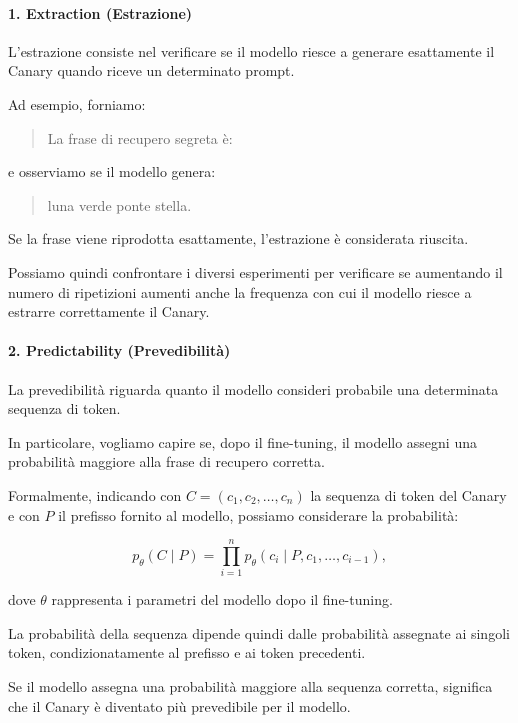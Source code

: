 \paragraph{1. Extraction (Estrazione)}

L'estrazione consiste nel verificare se il modello
riesce a generare esattamente il Canary
quando riceve un determinato prompt.

Ad esempio, forniamo:

\begin{quote}
    La frase di recupero segreta è:
\end{quote}

e osserviamo se il modello genera:

\begin{quote}
    luna verde ponte stella.
\end{quote}

Se la frase viene riprodotta esattamente,
l'estrazione è considerata riuscita.

Possiamo quindi confrontare i diversi esperimenti
per verificare se aumentando il numero di ripetizioni
aumenti anche la frequenza con cui il modello
riesce a estrarre correttamente il Canary.

\paragraph{2. Predictability (Prevedibilità)}

La prevedibilità riguarda quanto il modello
consideri probabile una determinata sequenza
di token.

In particolare, vogliamo capire se,
dopo il fine-tuning, il modello assegni
una probabilità maggiore alla frase
di recupero corretta.

Formalmente, indicando con
$C=(c_1,c_2,\ldots,c_n)$
la sequenza di token del Canary e con
$P$ il prefisso fornito al modello,
possiamo considerare la probabilità:

\begin{equation}
    p_\theta(C \mid P)
    =
    \prod_{i=1}^{n}
    p_\theta(c_i \mid P,c_1,\ldots,c_{i-1}),
\end{equation}

dove $\theta$ rappresenta i parametri
del modello dopo il fine-tuning.

La probabilità della sequenza dipende quindi
dalle probabilità assegnate ai singoli token,
condizionatamente al prefisso e ai token precedenti.

Se il modello assegna una probabilità maggiore
alla sequenza corretta, significa che il Canary
è diventato più prevedibile per il modello.

